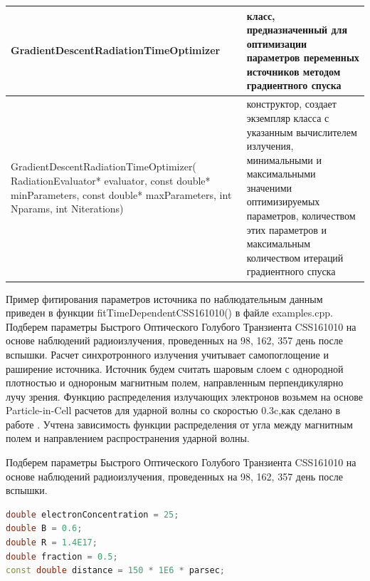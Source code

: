 \begin{small}
\begin{xtabular}{|p{0.5\textwidth}|p{0.5\textwidth}|}
		\hline
		\textbf{GradientDescentRadiationTimeOptimizer} & класс, предназначенный для оптимизации параметров переменных источников методом градиентного спуска\\
		\hline
		GradientDescentRadiationTimeOptimizer( RadiationEvaluator* evaluator, const double* minParameters, const double* maxParameters, int Nparams, int Niterations) & конструктор, создает экземпляр класса с указанным вычислителем излучения, минимальными и максимальными значеними оптимизируемых параметров, количеством этих параметров и максимальным количеством итераций градиентного спуска\\
		\hline		
\end{xtabular}
\end{small}

Пример фитирования параметров источника по наблюдательным данным приведен в функции fitTimeDependentCSS161010() в файле examples.cpp. Подберем параметры Быстрого Оптического Голубого Транзиента CSS161010 на основе наблюдений радиоизлучения, проведенных на 98, 162, 357 день после вспышки.  Расчет синхротронного излучения учитывает самопоглощение и раширение источника. Источник будем считать шаровым слоем с однородной плотностью и однороным магнитным полем, направленным перпендикулярно лучу зрения. Функцию распределения излучающих электронов возьмем на основе Particle-in-Cell расчетов для ударной волны со скоростью 0.3c,как сделано в работе \cite{BykovUniverse}. Учтена зависимость функции распределения от угла между магнитным полем и направлением распространения ударной волны.

Подберем параметры Быстрого Оптического Голубого Транзиента CSS161010 на основе наблюдений радиоизлучения, проведенных на 98, 162, 357 день после вспышки. 
\begin{lstlisting}[language=c++]
double electronConcentration = 25;
double B = 0.6;
double R = 1.4E17;
double fraction = 0.5;
const double distance = 150 * 1E6 * parsec;
\end{lstlisting}
